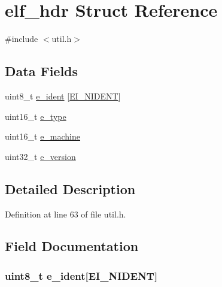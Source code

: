 \hypertarget{structelf__hdr}{}\section{elf\+\_\+hdr Struct Reference}
\label{structelf__hdr}


{\ttfamily \#include $<$util.\+h$>$}

\subsection*{Data Fields}
\begin{DoxyCompactItemize}
\item 
uint8\+\_\+t \hyperlink{structelf__hdr_a473c0788d341bbd65886b559f28f6941}{e\+\_\+ident} \mbox{[}\hyperlink{loader_2src_2headers_2util_8h_ae407130db14180c6737390604ba7c1fe}{E\+I\+\_\+\+N\+I\+D\+E\+NT}\mbox{]}
\item 
uint16\+\_\+t \hyperlink{structelf__hdr_a4160b480f72e4477cab7a0375f8535ea}{e\+\_\+type}
\item 
uint16\+\_\+t \hyperlink{structelf__hdr_a2309339880d17e277892a8850e819d55}{e\+\_\+machine}
\item 
uint32\+\_\+t \hyperlink{structelf__hdr_ab5ece8e1aa0f68bcf4a3476200dc29dc}{e\+\_\+version}
\end{DoxyCompactItemize}


\subsection{Detailed Description}


Definition at line 63 of file util.\+h.



\subsection{Field Documentation}
\subsubsection[{\texorpdfstring{e\+\_\+ident}{e_ident}}]{\setlength{\rightskip}{0pt plus 5cm}uint8\+\_\+t e\+\_\+ident\mbox{[}{\bf E\+I\+\_\+\+N\+I\+D\+E\+NT}\mbox{]}}\hypertarget{structelf__hdr_a473c0788d341bbd65886b559f28f6941}{}\label{structelf__hdr_a473c0788d341bbd65886b559f28f6941}


